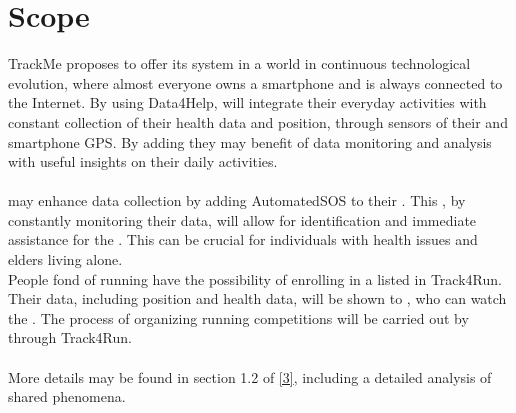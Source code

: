 \documentclass[../../DD.tex]{subfiles}
\begin{document}
\section{Scope}
	TrackMe proposes to offer its system in a world in continuous technological evolution, where almost everyone owns a smartphone and is always connected to the Internet.
	By using Data4Help,  will integrate their everyday activities with constant collection of their health data and position, through sensors of their  and smartphone GPS. By adding  they may benefit of data monitoring and analysis with useful insights on their daily activities. \\\\
	 may enhance data collection by adding AutomatedSOS to their . This , by constantly monitoring their data, will allow for identification and immediate assistance for the . This can be crucial for individuals with health issues and elders living alone.\\
	People fond of running have the possibility of enrolling in a  listed in Track4Run. Their data, including position and health data, will be shown to , who can watch the . The process of organizing running competitions will be carried out by  through Track4Run.\\\\
	More details may be found in section 1.2 of \hyperref[ref:3]{[3]}, including a detailed analysis of shared phenomena.
\end{document}
